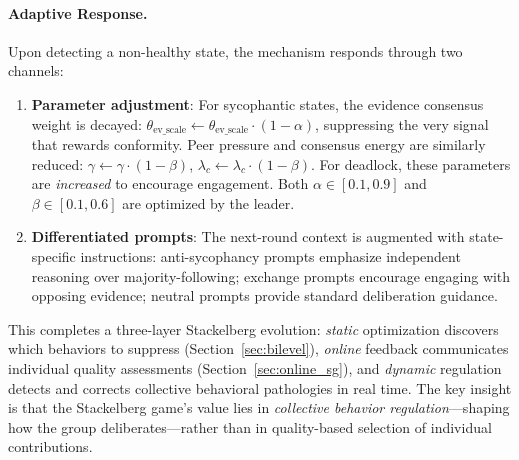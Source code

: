 \paragraph{Adaptive Response.}
Upon detecting a non-healthy state, the mechanism responds through two channels:
\begin{enumerate}
    \item \textbf{Parameter adjustment}: For sycophantic states, the evidence consensus weight is decayed: $\theta_{\text{ev\_scale}} \leftarrow \theta_{\text{ev\_scale}} \cdot (1 - \alpha)$, suppressing the very signal that rewards conformity. Peer pressure and consensus energy are similarly reduced: $\gamma \leftarrow \gamma \cdot (1 - \beta)$, $\lambda_c \leftarrow \lambda_c \cdot (1 - \beta)$. For deadlock, these parameters are \emph{increased} to encourage engagement. Both $\alpha \in [0.1, 0.9]$ and $\beta \in [0.1, 0.6]$ are optimized by the leader.
    \item \textbf{Differentiated prompts}: The next-round context is augmented with state-specific instructions: anti-sycophancy prompts emphasize independent reasoning over majority-following; exchange prompts encourage engaging with opposing evidence; neutral prompts provide standard deliberation guidance.
\end{enumerate}

This completes a three-layer Stackelberg evolution: \emph{static} optimization discovers which behaviors to suppress (Section~\ref{sec:bilevel}), \emph{online} feedback communicates individual quality assessments (Section~\ref{sec:online_sg}), and \emph{dynamic} regulation detects and corrects collective behavioral pathologies in real time. The key insight is that the Stackelberg game's value lies in \emph{collective behavior regulation}---shaping how the group deliberates---rather than in quality-based selection of individual contributions.
